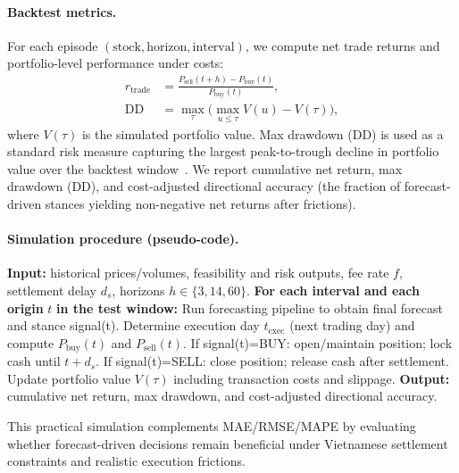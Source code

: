 \documentclass{ieeeaccess}
\begin{document}
\paragraph{Backtest metrics.}
For each episode $(\text{stock},\text{horizon},\text{interval})$, we compute net trade returns and portfolio-level performance under costs:
\begin{align}
r_{\text{trade}} &= \frac{P_{\text{sell}}(t+h)-P_{\text{buy}}(t)}{P_{\text{buy}}(t)},\\
\text{DD} &= \max_{\tau}\Big(\max_{u\le \tau} V(u) - V(\tau)\Big), 
\end{align}
where $V(\tau)$ is the simulated portfolio value. Max drawdown (DD) is used as a standard risk measure capturing the largest peak-to-trough decline in portfolio value over the backtest window~\cite{magdon2004maxdrawdown}. We report cumulative net return, max drawdown (DD), and cost-adjusted directional accuracy (the fraction of forecast-driven stances yielding non-negative net returns after frictions).

\paragraph{Simulation procedure (pseudo-code).}
\begin{algorithmic}[1]
\STATE \textbf{Input:} historical prices/volumes, feasibility and risk outputs, fee rate $f$, settlement delay $d_s$, horizons $h\in\{3,14,60\}$.
\STATE \textbf{For each interval and each origin } $t$ \textbf{in the test window:}
\STATE \hspace{0.8em}Run forecasting pipeline to obtain final forecast and stance signal(t).
\STATE \hspace{0.8em}Determine execution day $t_{\text{exec}}$ (next trading day) and compute $P_{\text{buy}}(t)$ and $P_{\text{sell}}(t)$.
\STATE \hspace{0.8em}If signal(t)=BUY: open/maintain position; lock cash until $t+d_s$.
\STATE \hspace{0.8em}If signal(t)=SELL: close position; release cash after settlement.
\STATE \hspace{0.8em}Update portfolio value $V(\tau)$ including transaction costs and slippage.
\STATE \textbf{Output:} cumulative net return, max drawdown, and cost-adjusted directional accuracy.
\end{algorithmic}

\noindent This practical simulation complements MAE/RMSE/MAPE by evaluating whether forecast-driven decisions remain beneficial under Vietnamese settlement constraints and realistic execution frictions.
\end{document}
